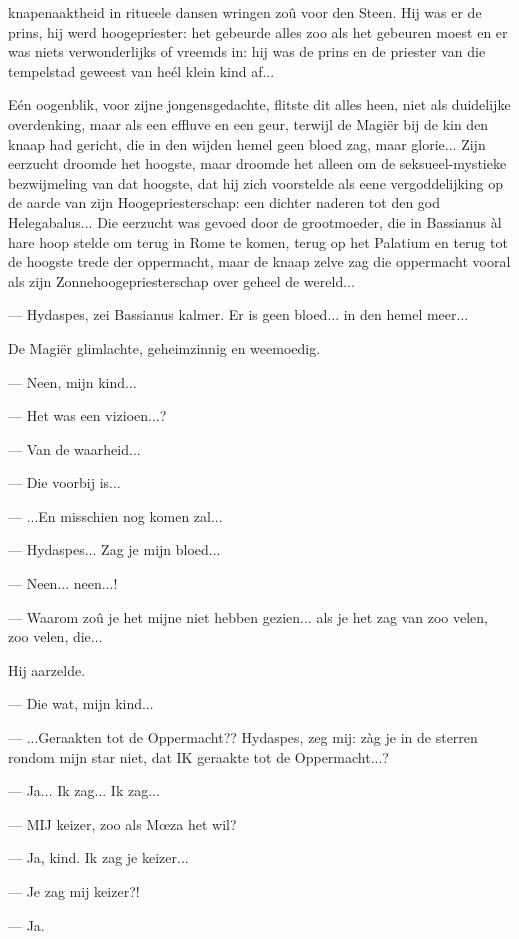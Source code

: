 \documentclass[a4paper, 12pt, oneside, dutch]{article}
\begin{document}
knapenaaktheid in ritueele dansen wringen zoû voor den Steen. Hij was er de prins, hij werd hoogepriester: het gebeurde alles zoo als het gebeuren moest en er was niets verwonderlijks of vreemds in: hij was de prins en de priester van die tempelstad geweest van heél klein kind af...

Eén oogenblik, voor zijne jongensgedachte, flitste dit alles heen, niet als duidelijke overdenking, maar als een effluve en een geur, terwijl de Magiër bij de kin den knaap had gericht, die in den wijden hemel geen bloed zag, maar glorie... Zijn eerzucht droomde het hoogste, maar droomde het alleen om de seksueel-mystieke bezwijmeling van dat hoogste, dat hij zich voorstelde als eene vergoddelijking op de aarde van zijn Hoogepriesterschap: een dichter naderen tot den god Helegabalus... Die eerzucht was gevoed door de grootmoeder, die in Bassianus àl hare hoop stelde om terug in Rome te komen, terug op het Palatium en terug tot de hoogste trede der oppermacht, maar de knaap zelve zag die oppermacht vooral als zijn Zonnehoogepriesterschap over geheel de wereld...

--- Hydaspes, zei Bassianus kalmer. Er is geen bloed... in den hemel meer...

De Magiër glimlachte, geheimzinnig en weemoedig.

--- Neen, mijn kind...

--- Het was een vizioen...?

--- Van de waarheid...

--- Die voorbij is...

--- ...En misschien nog komen zal...

--- Hydaspes... Zag je mijn bloed...

--- Neen... neen...!

--- Waarom zoû je het mijne niet hebben gezien... als je het zag van zoo velen, zoo velen, die...

Hij aarzelde.

--- Die wat, mijn kind...

--- ...Geraakten tot de Oppermacht?? Hydaspes, zeg mij: zàg je in de sterren rondom mijn star niet, dat IK geraakte tot de Oppermacht...?

--- Ja... Ik zag... Ik zag...

--- MIJ keizer, zoo als Mœza het wil?

--- Ja, kind. Ik zag je keizer...

--- Je zag mij keizer?!

--- Ja.
\end{document}
